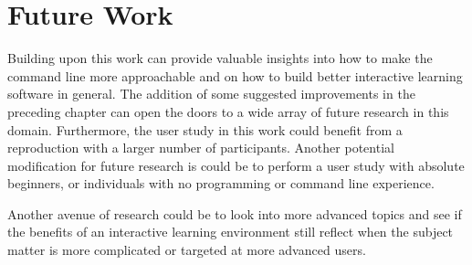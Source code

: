 \section{Future Work}
Building upon this work can provide valuable insights into how to make the
command line more approachable and on how to build better interactive learning
software in general. The addition of some suggested improvements in the
preceding chapter can open the doors to a wide array of future research in
this domain. Furthermore, the user study in this work could benefit from a
reproduction with a larger number of participants. Another potential
modification for future research is could be to perform a user study with
absolute beginners, or individuals with no programming or command line
experience.

Another avenue of research could be to look into more advanced topics and see if
the benefits of an interactive learning environment still reflect when the
subject matter is more complicated or targeted at more advanced users.
